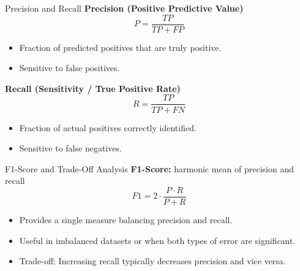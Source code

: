 \documentclass[serif, aspectratio=169]{beamer}
\begin{document}
    \begin{frame}{Precision and Recall}
        \textbf{Precision (Positive Predictive Value)}
        \[
            P = \frac{TP}{TP + FP}
        \]
        \begin{itemize}
            \item Fraction of predicted positives that are truly positive.
            \item Sensitive to false positives.
        \end{itemize}

        \vspace{0.3cm}
        \textbf{Recall (Sensitivity / True Positive Rate)}
        \[
            R = \frac{TP}{TP + FN}
        \]
        \begin{itemize}
            \item Fraction of actual positives correctly identified.
            \item Sensitive to false negatives.
        \end{itemize}
    \end{frame}

    \begin{frame}{F1-Score and Trade-Off Analysis}
        \textbf{F1-Score:} harmonic mean of precision and recall
        \[
            F1 = 2 \cdot \frac{P \cdot R}{P + R}
        \]

        \vspace{0.3cm}
        \begin{itemize}
            \item Provides a single measure balancing precision and recall.
            \item Useful in imbalanced datasets or when both types of error are significant.
            \item Trade-off: Increasing recall typically decreases precision and vice versa.
        \end{itemize}
    \end{frame}
\end{document}
